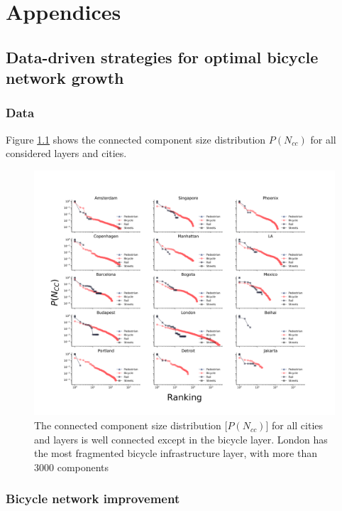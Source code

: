 \chapter{Appendices}

\section{Data-driven strategies for optimal bicycle network growth}
\subsection{Data}

Figure \ref{fig:Nodes} shows the connected component size distribution $P(N_{cc})$ for all considered layers and cities.

\begin{figure}[h!]
  \centering
  \includegraphics[width=\textwidth]{images/datadriven/Nodes_cc.png}
  \caption[Connected component size distribution for analyzed cities]{The connected component size distribution [$P(N_{cc})$] for all cities and layers is well connected except in the bicycle layer. London has the most fragmented bicycle infrastructure layer, with more than 3000 components}
  \label{fig:Nodes}
\end{figure}


\subsection{Bicycle network improvement}\label{SI:BikeImprovement}

